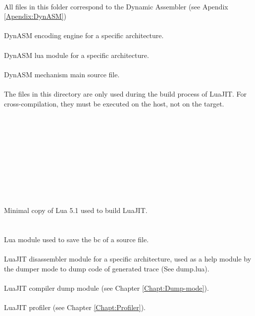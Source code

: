 \\
All files in this folder correspond to the Dynamic Assembler (see Apendix \ref{Apendix:DynASM})\\
\\
DynASM encoding engine for a specific architecture.\\
\\{}
DynASM lua module for a specific architecture.\\
\\
DynASM mechanism main source file.\\
\\
The files in this directory are only used during the build process of LuaJIT.
For cross-compilation, they must be executed on the host, not on the target.\\
\\
\\
\\
\\
\\
\\
\\
\\
\\
\\
Minimal copy of Lua 5.1 used to build LuaJIT.\\
\\
\\
Lua module used to save the bc of a source file.\\
\\
LuaJIT disassembler module for a specific architecture, used as a help module by
the dumper mode to dump code of generated trace (See dump.lua).\\
\\
LuaJIT compiler dump module (see Chapter \ref{Chapt:Dump-mode}).\\
\\
LuaJIT profiler (see Chapter \ref{Chapt:Profiler}).\\
